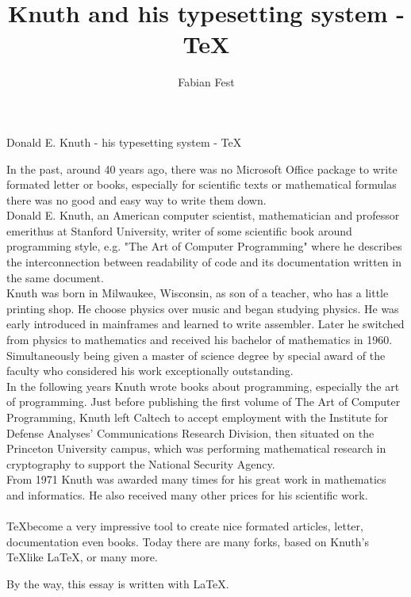 \documentclass[12pt,a4paper]{letter}
\author{Fabian Fest}
\title{Knuth and his typesetting system - \TeX}
\begin{document}
 
	\begin{letter}{} 
		\opening{Donald E. Knuth - his typesetting system - \TeX} 
			
		In the past, around 40 years ago, there was no Microsoft Office package to write formated letter or books, especially for scientific texts or mathematical formulas there was no good and easy way to write them down.
		\\
		Donald E. Knuth, an American computer scientist, mathematician and professor emerithus at Stanford University, writer of some scientific book around programming style, e.g. "The Art of Computer Programming" where he describes the interconnection between readability of code and its documentation written in the same document.
		\\
		Knuth was born in Milwaukee, Wisconsin, as son of a teacher, who has a little printing shop. He choose physics over music and began studying physics. He was early introduced in mainframes and learned to write assembler. Later he switched from physics to mathematics and received his bachelor of mathematics in 1960. Simultaneously being given a master of science degree by special award of the faculty who considered his work exceptionally outstanding. 
		\\
		In the following years Knuth wrote books about programming, especially the art of programming.
		Just before publishing the first volume of The Art of Computer Programming, Knuth left Caltech to accept employment with the Institute for Defense Analyses' Communications Research Division, then situated on the Princeton University campus, which was performing mathematical research in cryptography to support the National Security Agency.
		\\
		From 1971 Knuth was awarded many times for his great work in mathematics and informatics. He also received many other prices for his scientific work.
		\\\\
		\TeX \space become a very impressive tool to create nice formated articles, letter, documentation even books. Today there are many forks, based on Knuth's \space \TeX \space like \LaTeX, \LaTeXe \space or many more.
		
		
		\closing{By the way, this essay is written with \LaTeX.} 
	\end{letter} 
\end{document}
